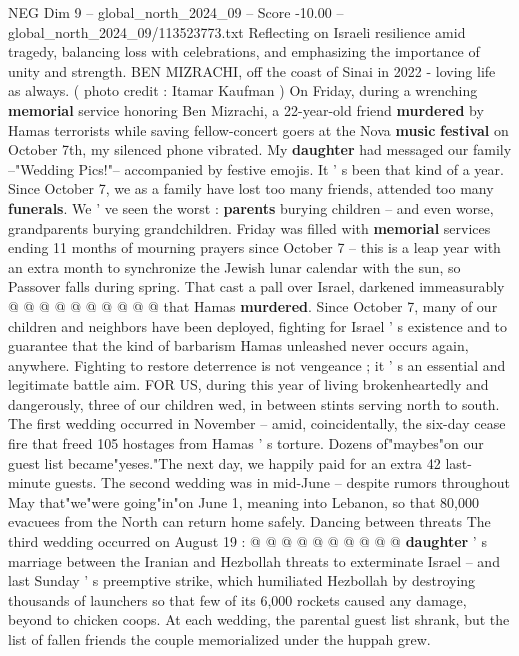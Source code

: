\begin{textsample}{NEG Dim 9 – global\_north\_2024\_09 – Score -10.00 – global\_north\_2024\_09/113523773.txt}  \label{ex:f9_neg_019}
Reflecting on Israeli resilience amid tragedy, balancing loss with celebrations, and emphasizing the importance of unity and strength.
BEN MIZRACHI, off the coast of Sinai in 2022 - loving life as always. ( photo credit : Itamar Kaufman ) On Friday, during a wrenching \textbf{memorial} service honoring Ben Mizrachi, a 22-year-old friend \textbf{murdered} by Hamas terrorists while saving fellow-concert goers at the Nova \textbf{music} \textbf{festival} on October 7th, my silenced phone vibrated.
My \textbf{daughter} had messaged our family --"Wedding Pics!"-- accompanied by festive emojis.
It ' s been that kind of a year.
Since October 7, we as a family have lost too many friends, attended too many \textbf{funerals}.
We ' ve seen the worst : \textbf{parents} burying children -- and even worse, grandparents burying grandchildren.
Friday was filled with \textbf{memorial} services ending 11 months of mourning prayers since October 7 -- this is a leap year with an extra month to synchronize the Jewish lunar calendar with the sun, so Passover falls during spring.
That cast a pall over Israel, darkened immeasurably @ @ @ @ @ @ @ @ @ @ that Hamas \textbf{murdered}.
Since October 7, many of our children and neighbors have been deployed, fighting for Israel ' s existence and to guarantee that the kind of barbarism Hamas unleashed never occurs again, anywhere.
Fighting to restore deterrence is not vengeance ; it ' s an essential and legitimate battle aim.
FOR US, during this year of living brokenheartedly and dangerously, three of our children wed, in between stints serving north to south.
The first wedding occurred in November -- amid, coincidentally, the six-day cease fire that freed 105 hostages from Hamas ' s torture.
Dozens of"maybes"on our guest list became"yeses."The next day, we happily paid for an extra 42 last-minute guests.
The second wedding was in mid-June -- despite rumors throughout May that"we"were going"in"on June 1, meaning into Lebanon, so that 80,000 evacuees from the North can return home safely.
Dancing between threats The third wedding occurred on August 19 : @ @ @ @ @ @ @ @ @ @ \textbf{daughter} ' s marriage between the Iranian and Hezbollah threats to exterminate Israel -- and last Sunday ' s preemptive strike, which humiliated Hezbollah by destroying thousands of launchers so that few of its 6,000 rockets caused any damage, beyond to chicken coops.
At each wedding, the parental guest list shrank, but the list of fallen friends the couple memorialized under the huppah grew.

\end{textsample}
